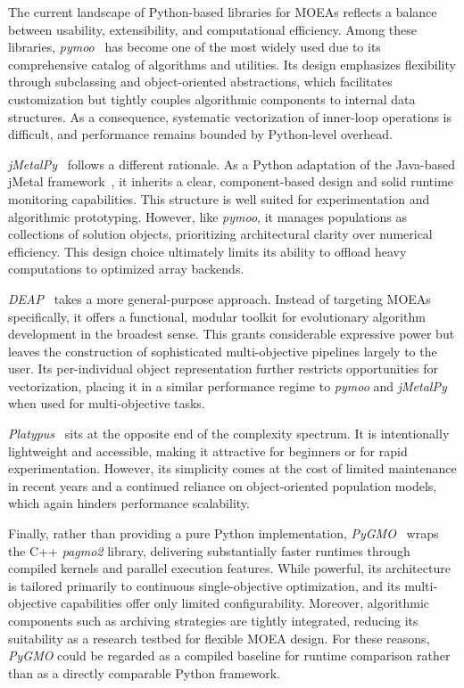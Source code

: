 \documentclass[final,5p,times,twocolumn]{elsarticle}
\begin{document}
The current landscape of Python-based libraries for MOEAs reflects a balance between usability, extensibility, and computational efficiency. Among these libraries, \textit{pymoo}~\cite{BD20} has become one of the most widely used due to its comprehensive catalog of algorithms and utilities. Its design emphasizes flexibility through subclassing and object-oriented abstractions, which facilitates customization but tightly couples algorithmic components to internal data structures. As a consequence, systematic vectorization of inner-loop operations is difficult, and performance remains bounded by Python-level overhead. 

\textit{jMetalPy}~\cite{BNG+19} follows a different rationale. As a Python adaptation of the Java-based jMetal framework~\cite{DN11}, it inherits a clear, component-based design and solid runtime monitoring capabilities. This structure is well suited for experimentation and algorithmic prototyping. However, like \textit{pymoo}, it manages populations as collections of solution objects, prioritizing architectural clarity over numerical efficiency. This design choice ultimately limits its ability to offload heavy computations to optimized array backends. 

\textit{DEAP}~\cite{FDG+12}  takes a more general-purpose approach. Instead of targeting MOEAs specifically, it offers a functional, modular toolkit for evolutionary algorithm development in the broadest sense. This grants considerable expressive power but leaves the construction of sophisticated multi-objective pipelines largely to the user. Its per-individual object representation further restricts opportunities for vectorization, placing it in a similar performance regime to \textit{pymoo} and \textit{jMetalPy} when used for multi-objective tasks.

\textit{Platypus}~\cite{hadka15} sits at the opposite end of the complexity spectrum. It is intentionally lightweight and accessible, making it attractive for beginners or for rapid experimentation. However, its simplicity comes at the cost of limited maintenance in recent years and a continued reliance on object-oriented population models, which again hinders performance scalability.

Finally, rather than providing a pure Python implementation, \textit{PyGMO}~\cite{BI20} wraps the C++ \textit{pagmo2} library, delivering substantially faster runtimes through compiled kernels and parallel execution features. While powerful, its architecture is tailored primarily to continuous single-objective optimization, and its multi-objective capabilities offer only limited configurability. Moreover, algorithmic components such as archiving strategies are tightly integrated, reducing its suitability as a research testbed for flexible MOEA design. For these reasons, \textit{PyGMO} could be regarded as a compiled baseline for runtime comparison rather than as a directly comparable Python framework.
\end{document}
